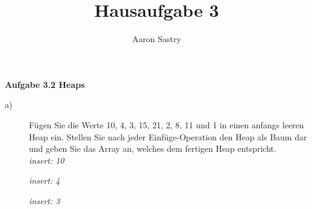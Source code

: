 \documentclass[12pt, a4paper, oneside]{article}
\title{Hausaufgabe 3}
\author{Aaron Sastry}
\begin{document}
\maketitle

\textbf{Aufgabe 3.2 Heaps}
\begin{description}
	\item[a)] Fügen Sie die Werte 10, 4, 3, 15, 21, 2, 8, 11 und 1 in einen anfangs leeren Heap ein.
	Stellen Sie nach jeder Einfüge-Operation den Heap als Baum dar und geben Sie das Array an, welches dem fertigen Heap entspricht.
	\\
	
	\emph{insert: 10}
	\emph{insert: 4}
	\emph{insert: 3}
	

\end{description}
\end{document}
